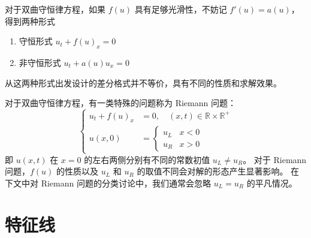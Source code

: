 对于双曲守恒律方程，如果 $f(u)$ 具有足够光滑性，不妨记 $f'(u) = a(u)$，得到两种形式
\begin{enumerate}
    \item 守恒形式 $u_t + f(u)_x = 0$
    \item 非守恒形式 $u_t + a(u) u_x = 0$
\end{enumerate}
从这两种形式出发设计的差分格式并不等价，具有不同的性质和求解效果。

对于双曲守恒律方程，有一类特殊的问题称为 Riemann 问题：
\[
    \left\{
    \begin{aligned}
        u_t + f(u)_x & = 0,\quad (x,t) \in \mathbb{R} \times  \mathbb{R}^+ \\
        u(x,0)       & =
        \begin{cases}
            u_L & x < 0 \\
            u_R & x > 0
        \end{cases}
    \end{aligned}
    \right.
\]
即 $u(x,t)$ 在 $x = 0$ 的左右两侧分别有不同的常数初值 $u_L \neq u_R$。
对于 Riemann 问题，$f(u)$ 的性质以及 $u_L$ 和 $u_R$ 的取值不同会对解的形态产生显著影响。
在下文中对 Riemann 问题的分类讨论中，我们通常会忽略 $u_L = u_R$ 的平凡情况。

\section{特征线}

